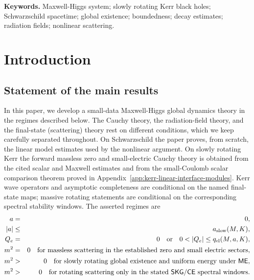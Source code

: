\documentclass[11pt]{article}
\numberwithin{equation}{section}
\theoremstyle{plain}
\theoremstyle{definition}
\theoremstyle{remark}
\newcommand{\SKG}{\mathsf{SKG}}
\newcommand{\CElec}{\mathsf{CE}}
\newcommand{\ME}{\mathsf{ME}}
\begin{document}
\noindent\textbf{Keywords.} Maxwell-Higgs system; slowly rotating Kerr black holes; Schwarzschild spacetime; global existence; boundedness; decay estimates; radiation fields; nonlinear scattering.

\tableofcontents
\medskip

\section{Introduction}\label{sec:intro}

\subsection{Statement of the main results}\label{subsec:main-results}

In this paper, we develop a small-data Maxwell-Higgs global dynamics theory in the regimes described below.  The Cauchy theory, the radiation-field theory, and the final-state (scattering) theory rest on different conditions, which we keep carefully separated throughout.  On Schwarzschild the paper proves, from scratch, the linear model estimates used by the nonlinear argument.  On slowly rotating Kerr the forward massless zero and small-electric Cauchy theory is obtained from the cited scalar and Maxwell estimates and from the small-Coulomb scalar comparison theorem proved in Appendix~\ref{app:kerr-linear-interface-modules}.  Kerr wave operators and asymptotic completeness are conditional on the named final-state maps; massive rotating statements are conditional on the corresponding spectral stability windows.  The asserted regimes are
\begin{eqnarray}
 a&=&0,
 \label{eq:main-regimes}\\
 |a|&\le& a_{\mathrm{slow}}(M,K),
 \nonumber\\
 Q_e&=&0\quad\hbox{or}\quad 0<|Q_e|\le q_{\rm el}(M,a,K),
 \nonumber\\
 m^2&=&0\quad\hbox{for massless scattering in the established zero and small electric sectors},
 \nonumber\\
 m^2&>&0\quad\hbox{for slowly rotating global existence and uniform energy under }\ME,
 \nonumber\\
 m^2&>&0\quad\hbox{for rotating scattering only in the stated }\SKG/\CElec\hbox{ spectral windows}.
 \nonumber
\end{eqnarray}
\end{document}
